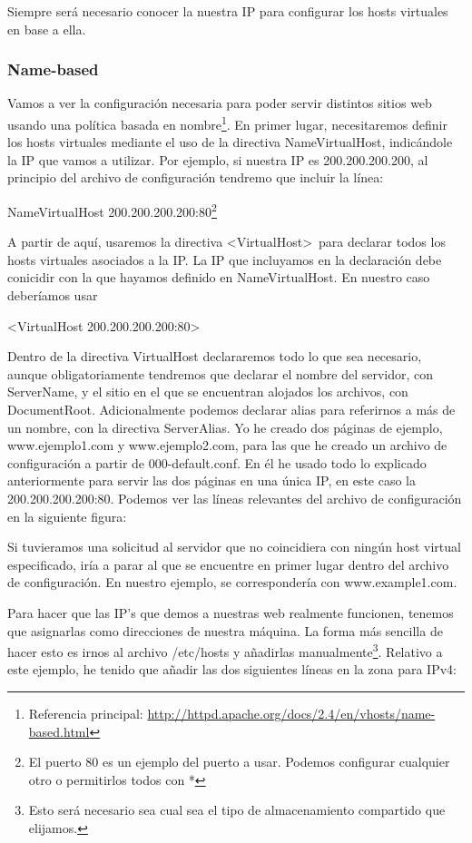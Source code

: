 \documentclass[a4paper, 10pt]{article} %
\begin{document}
Siempre será necesario conocer la nuestra IP para configurar los hosts virtuales en base a ella. 

\subsubsection{Name-based}

Vamos a ver la configuración necesaria para poder servir distintos sitios web usando una política basada en nombre\footnote{Referencia principal: \url{http://httpd.apache.org/docs/2.4/en/vhosts/name-based.html}}. En primer lugar, necesitaremos definir los hosts virtuales mediante el uso de la directiva NameVirtualHost, indicándole la IP que vamos a utilizar. Por ejemplo, si nuestra IP es 200.200.200.200, al principio del archivo de configuración tendremo que incluir la línea:

NameVirtualHost 200.200.200.200:80\footnote{El puerto 80 es un ejemplo del puerto a usar. Podemos configurar cualquier otro o permitirlos todos con *}

A partir de aquí, usaremos la directiva <VirtualHost>\ para declarar todos los hosts virtuales asociados a la IP. La IP que incluyamos en la declaración debe conicidir con la que hayamos definido en NameVirtualHost. En nuestro caso deberíamos usar 

<VirtualHost 200.200.200.200:80>

Dentro de la directiva VirtualHost declararemos todo lo que sea necesario, aunque obligatoriamente tendremos que declarar el nombre del servidor, con ServerName, y el sitio en el que se encuentran alojados los archivos, con DocumentRoot. Adicionalmente podemos declarar alias para referirnos a más de un nombre, con la directiva ServerAlias. Yo he creado dos páginas de ejemplo, www.ejemplo1.com y www.ejemplo2.com, para las que he creado un archivo de configuración a partir de 000-default.conf. En él he usado todo lo explicado anteriormente para servir las dos páginas en una única IP, en este caso la 200.200.200.200:80. Podemos ver las líneas relevantes del archivo de configuración en la siguiente figura: 


Si tuvieramos una solicitud al servidor que no coincidiera con ningún host virtual especificado, iría a parar al que se encuentre en primer lugar dentro del archivo de configuración. En nuestro ejemplo, se correspondería con www.example1.com. 

Para hacer que las IP's que demos a nuestras web realmente funcionen, tenemos que asignarlas como direcciones de nuestra máquina. La forma más sencilla de hacer esto es irnos al archivo /etc/hosts y añadirlas manualmente\footnote{Esto será necesario sea cual sea el tipo de almacenamiento compartido que elijamos.}. Relativo a este ejemplo, he tenido que añadir las dos siguientes líneas en la zona para IPv4: 
\end{document}
